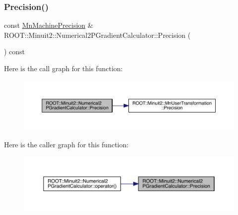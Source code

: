 \mbox{\label{classROOT_1_1Minuit2_1_1Numerical2PGradientCalculator_a661d6dcac5eeb09c36d9b64829f0448c}} 
\subsubsection{\texorpdfstring{Precision()}{Precision()}\hspace{0.1cm}{\footnotesize\ttfamily [2/3]}}
{\footnotesize\ttfamily const \mbox{\hyperlink{classROOT_1_1Minuit2_1_1MnMachinePrecision}{Mn\+Machine\+Precision}} \& R\+O\+O\+T\+::\+Minuit2\+::\+Numerical2\+P\+Gradient\+Calculator\+::\+Precision (\begin{DoxyParamCaption}{ }\end{DoxyParamCaption}) const}

Here is the call graph for this function\+:
\nopagebreak
\begin{figure}[H]
\begin{center}
\leavevmode
\includegraphics[width=350pt]{d0/d82/classROOT_1_1Minuit2_1_1Numerical2PGradientCalculator_a661d6dcac5eeb09c36d9b64829f0448c_cgraph}
\end{center}
\end{figure}
Here is the caller graph for this function\+:
\nopagebreak
\begin{figure}[H]
\begin{center}
\leavevmode
\includegraphics[width=350pt]{d0/d82/classROOT_1_1Minuit2_1_1Numerical2PGradientCalculator_a661d6dcac5eeb09c36d9b64829f0448c_icgraph}
\end{center}
\end{figure}
\mbox{\label{classROOT_1_1Minuit2_1_1Numerical2PGradientCalculator_a2f964953d797badaf6f2cd476e330c3f}} 
